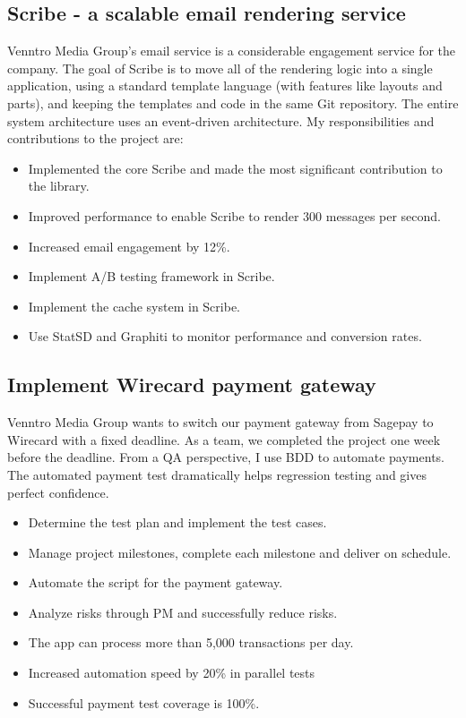 \documentclass[a4paper]{twentysecondcv-english} %
\begin{document}
\subsection{Scribe - a scalable email rendering service}
Venntro Media Group's email service is a considerable engagement service for the company. The goal of Scribe is to move all of the rendering logic into a single application, using a standard template language (with features like layouts and parts), and keeping the templates and code in the same Git repository. The entire system architecture uses an event-driven architecture. My responsibilities and contributions to the project are:
\begin{itemize}
    \item Implemented the core Scribe and made the most significant contribution to the library.
    \item Improved performance to enable Scribe to render 300 messages per second.
    \item Increased email engagement by 12\%.
    \item Implement A/B testing framework in Scribe.
    \item Implement the cache system in Scribe.
    \item Use StatSD and Graphiti to monitor performance and conversion rates.
\end{itemize}

\subsection{Implement Wirecard payment gateway}

Venntro Media Group wants to switch our payment gateway from Sagepay to Wirecard with a fixed deadline. As a team, we completed the project one week before the deadline. From a QA perspective, I use BDD to automate payments. The automated payment test dramatically helps regression testing and gives perfect confidence.
\begin{itemize}
    \item Determine the test plan and implement the test cases.
    \item Manage project milestones, complete each milestone and deliver on schedule.
    \item Automate the script for the payment gateway.
    \item Analyze risks through PM and successfully reduce risks.
    \item The app can process more than 5,000 transactions per day.
    \item Increased automation speed by 20\% in parallel tests
    \item Successful payment test coverage is 100\%.
\end{itemize}
\end{document}
